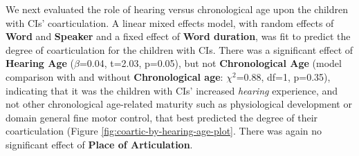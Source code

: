 \documentclass[
]{article}
\begin{document}
We next evaluated the role of hearing versus chronological age upon the children with CIs' coarticulation. A linear mixed effects model, with random effects of \textbf{Word} and \textbf{Speaker} and a fixed effect of \textbf{Word duration}, was fit to predict the degree of coarticulation for the children with CIs. There was a significant effect of \textbf{Hearing Age} (\(\beta\)=0.04, t=2.03, p=0.05), but not \textbf{Chronological Age} (model comparison with and without \textbf{Chronological age}: \(\chi^2\)=0.88, df=1, p=0.35), indicating that it was the children with CIs' increased \emph{hearing} experience, and not other chronological age-related maturity such as physiological development or domain general fine motor control, that best predicted the degree of their coarticulation (Figure \ref{fig:coartic-by-hearing-age-plot}. There was again no significant effect of \textbf{Place of Articulation}.
\end{document}
